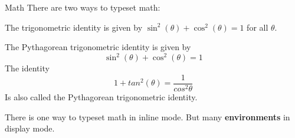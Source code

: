 \copyrightTim

\begin{frame}[fragile]{Math}
There are two ways to typeset math:

\begin{tcolorbox}[width=13cm, title={inline mode}, size=small]
    The trigonometric identity is given by \( \sin^2(\theta) + \cos^2(\theta) = 1 \) for all \( \theta \).
\end{tcolorbox}

 \begin{tcolorbox}[width=13cm, title={display mode}, size=small]
    The Pythagorean trigonometric identity is given by
    \begin{equation} \sin^2(\theta) + \cos^2(\theta) = 1 \end{equation}
    The identity
    \begin{equation} 1 + tan^2(\theta) = \frac{1}{cos^2\theta}\end{equation}
    Is also called the Pythagorean trigonometric identity.

\end{tcolorbox}

{\small There is one way to typeset math in inline mode.
But many \textbf{environments} in display mode.}
\end{frame}
